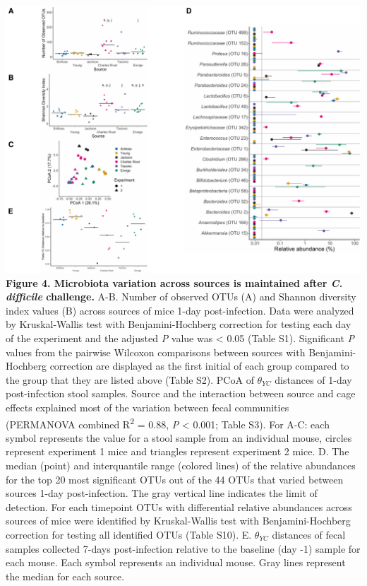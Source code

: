 \documentclass[
  11pt,
]{article}
\begin{document}
\newpage

\includegraphics{figure_4.pdf} \textbf{Figure 4. Microbiota variation
across sources is maintained after \emph{C. difficile} challenge.} A-B.
Number of observed OTUs (A) and Shannon diversity index values (B)
across sources of mice 1-day post-infection. Data were analyzed by
Kruskal-Wallis test with Benjamini-Hochberg correction for testing each
day of the experiment and the adjusted \emph{P} value was \textless{}
0.05 (Table S1). Significant \emph{P} values from the pairwise Wilcoxon
comparisons between sources with Benjamini-Hochberg correction are
displayed as the first initial of each group compared to the group that
they are listed above (Table S2). PCoA of \(\theta_{YC}\) distances of
1-day post-infection stool samples. Source and the interaction between
source and cage effects explained most of the variation between fecal
communities (PERMANOVA combined R\textsuperscript{2} = 0.88, \emph{P}
\textless{} 0.001; Table S3). For A-C: each symbol represents the value
for a stool sample from an individual mouse, circles represent
experiment 1 mice and triangles represent experiment 2 mice. D. The
median (point) and interquantile range (colored lines) of the relative
abundances for the top 20 most significant OTUs out of the 44 OTUs that
varied between sources 1-day post-infection. The gray vertical line
indicates the limit of detection. For each timepoint OTUs with
differential relative abundances across sources of mice were identified
by Kruskal-Wallis test with Benjamini-Hochberg correction for testing
all identified OTUs (Table S10). E. \(\theta_{YC}\) distances of fecal
samples collected 7-days post-infection relative to the baseline (day
-1) sample for each mouse. Each symbol represents an individual mouse.
Gray lines represent the median for each source.
\end{document}
